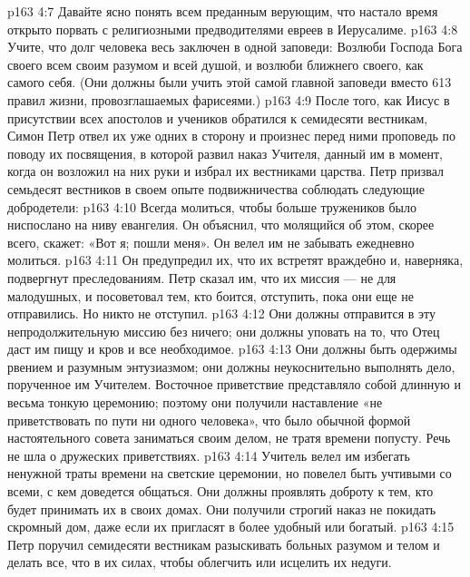 \vs p163 4:7 \bibnobreakspace Давайте ясно понять всем преданным верующим, что настало время открыто порвать с религиозными предводителями евреев в Иерусалиме.
\vs p163 4:8 \bibnobreakspace Учите, что долг человека весь заключен в одной заповеди: Возлюби Господа Бога своего всем своим разумом и всей душой, и возлюби ближнего своего, как самого себя. (Они должны были учить этой самой главной заповеди вместо 613 правил жизни, провозглашаемых фарисеями.)
\vs p163 4:9 \pc После того, как Иисус в присутствии всех апостолов и учеников обратился к семидесяти вестникам, Симон Петр отвел их уже одних в сторону и произнес перед ними проповедь по поводу их посвящения, в которой развил наказ Учителя, данный им в момент, когда он возложил на них руки и избрал их вестниками царства. Петр призвал семьдесят вестников в своем опыте подвижничества соблюдать следующие добродетели:
\vs p163 4:10 \bibnobreakspace {} Всегда молиться, чтобы больше тружеников было ниспослано на ниву евангелия. Он объяснил, что молящийся об этом, скорее всего, скажет: «Вот я; пошли меня». Он велел им не забывать ежедневно молиться.
\vs p163 4:11 \bibnobreakspace {} Он предупредил их, что их встретят враждебно и, наверняка, подвергнут преследованиям. Петр сказал им, что их миссия --- не для малодушных, и посоветовал тем, кто боится, отступить, пока они еще не отправились. Но никто не отступил.
\vs p163 4:12 \bibnobreakspace {} Они должны отправится в эту непродолжительную миссию без ничего; они должны уповать на то, что Отец даст им пищу и кров и все необходимое.
\vs p163 4:13 \bibnobreakspace {} Они должны быть одержимы рвением и разумным энтузиазмом; они должны неукоснительно выполнять дело, порученное им Учителем. Восточное приветствие представляло собой длинную и весьма тонкую церемонию; поэтому они получили наставление «не приветствовать по пути ни одного человека», что было обычной формой настоятельного совета заниматься своим делом, не тратя времени попусту. Речь не шла о дружеских приветствиях.
\vs p163 4:14 \bibnobreakspace {} Учитель велел им избегать ненужной траты времени на светские церемонии, но повелел быть учтивыми со всеми, с кем доведется общаться. Они должны проявлять доброту к тем, кто будет принимать их в своих домах. Они получили строгий наказ не покидать скромный дом, даже если их пригласят в более удобный или богатый.
\vs p163 4:15 \bibnobreakspace {} Петр поручил семидесяти вестникам разыскивать больных разумом и телом и делать все, что в их силах, чтобы облегчить или исцелить их недуги.
